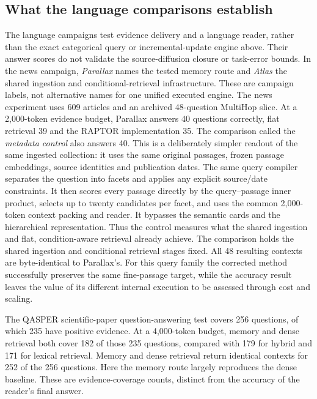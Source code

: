 \subsection{What the language comparisons establish}
The language campaigns test evidence delivery and a language reader, rather than the exact categorical query or incremental-update engine above. Their answer scores do not validate the source-diffusion closure or task-error bounds. In the news campaign, \emph{Parallax} names the tested memory route and \emph{Atlas} the shared ingestion and conditional-retrieval infrastructure. These are campaign labels, not alternative names for one unified executed engine. The news experiment uses 609 articles and an archived 48-question MultiHop slice. At a 2,000-token evidence budget, Parallax answers 40 questions correctly, flat retrieval 39 and the RAPTOR implementation 35. The comparison called the \emph{metadata control} also answers 40. This is a deliberately simpler readout of the same ingested collection: it uses the same original passages, frozen passage embeddings, source identities and publication dates. The same query compiler separates the question into facets and applies any explicit source/date constraints. It then scores every passage directly by the query--passage inner product, selects up to twenty candidates per facet, and uses the common 2,000-token context packing and reader. It bypasses the semantic cards and the hierarchical representation. Thus the control measures what the shared ingestion and flat, condition-aware retrieval already achieve. The comparison holds the shared ingestion and conditional retrieval stages fixed. All 48 resulting contexts are byte-identical to Parallax's. For this query family the corrected method successfully preserves the same fine-passage target, while the accuracy result leaves the value of its different internal execution to be assessed through cost and scaling.

The QASPER scientific-paper question-answering test covers 256 questions, of which 235 have positive evidence. At a 4,000-token budget, memory and dense retrieval both cover 182 of those 235 questions, compared with 179 for hybrid and 171 for lexical retrieval. Memory and dense retrieval return identical contexts for 252 of the 256 questions. Here the memory route largely reproduces the dense baseline. These are evidence-coverage counts, distinct from the accuracy of the reader's final answer.

